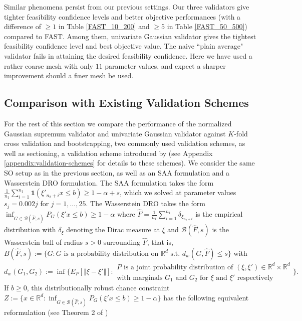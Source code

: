 \documentclass[mnsc,blindrev]{informs4} %
\newcommand{\R}{\mathbb{R}}
\begin{document}
Similar phenomena persist from our previous settings. Our three validators give tighter feasibility confidence levels and better objective performances (with a difference of $\geq 1$ in Table \ref{FAST_10_200} and $\geq 5$ in Table \ref{FAST_50_500}) compared to FAST. Among them, univariate Gaussian validator gives the tightest feasibility confidence level and best objective value. The naive ``plain average" validator fails in attaining the desired feasibility confidence. Here we have used a rather coarse mesh with only $11$ parameter values, and expect a sharper improvement should a finer mesh be used.

\subsection{Comparison with Existing Validation Schemes}
For the rest of this section we compare the performance of the normalized Gaussian supremum validator and univariate Gaussian validator against $K$-fold cross validation and bootstrapping, two commonly used validation schemes, as well as sectioning, a validation scheme introduced by \cite{xie2018distributionally} (see Appendix \ref{appendix:validation-schemes} for details to these schemes). We consider the same SO setup as in the previous section, as well as an SAA formulation and a Wasserstein DRO formulation. The SAA formulation takes the form $\frac{1}{n_1}\sum_{i=1}^{n_1}\mathbf{1}(\xi'_{n_2+i}x\leq b)\geq 1 - \alpha + s$, which we solved at parameter values $s_j=0.002j$ for $j=1,\ldots,25$. The Wasserstein DRO takes the form $\inf_{G\in \mathcal B(\hat F,s)}P_G(\xi'x\leq b)\geq 1-\alpha$ where $\hat F=\frac{1}{n_1}\sum_{i=1}^{n_1}\delta_{\xi_{n_2+i}}$ is the empirical distribution with $\delta_{\xi}$ denoting the Dirac measure at $\xi$ and $\mathcal B(\hat F,s)$ is the Wasserstein ball of radius $s>0$ surrounding $\hat F$, that is, $B(\hat F,s):=\{G:G\text{ is a probability distribution on }\R^d\text{ s.t. }d_w(G,\hat F)\leq s\}$ with 
\begin{equation*}
d_w(G_1,G_2):=\inf\Big\{E_P[\Vert \xi-\xi'\Vert]:
\begin{array}{l}
P\text{ is a joint probability distribution of }(\xi,\xi')\in\R^d\times \R^d\\
  \text{with marginals }G_1\text{ and }G_2\text{ for $\xi$ and $\xi'$ respectively}
\end{array}
\Big\}.
\end{equation*} If $b\geq 0$, this distributionally robust chance constraint $Z:=\{x\in \R^d:\inf_{G\in \mathcal B(\hat F,s)}P_G(\xi'x\leq b)\geq 1-\alpha\}$ has the following equivalent reformulation (see Theorem 2 of \cite{xie2018distributionally})
\end{document}
